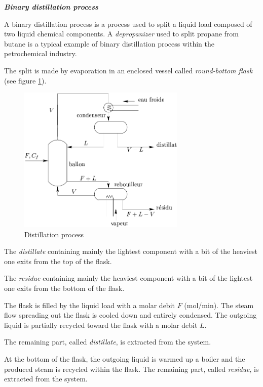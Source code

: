 \begin{exemple}{\bf \em Binary distillation process}

A binary distillation process is a process used to split a liquid load composed of two liquid chemical components.
A {\it depropanizer} used to split propane from butane is a typical example of binary distillation process within the petrochemical industry.

The split is made by evaporation in an enclosed vessel called {\em round-bottom flask} (see figure \ref{Fig:distillation}).
\begin{figure}[h]
\begin{center}
\includegraphics[width=8cm]{images/proc_distil}
\caption{Distillation process}
\label{Fig:distillation}
\end{center} 
\end{figure}
The {\it distillate} containing mainly the lightest component with a bit of the heaviest one exits from the top of the flask.

The {\it residue} containing mainly the heaviest component with a bit of the lightest one exits from the bottom of the flask.

The flask is filled by the liquid load with a molar debit $F$ (mol/min). 
The steam flow spreading out the flask is cooled down and entirely condensed.
The outgoing liquid is partially recycled toward the flask with a molar debit $L$. 

The remaining part, called {\it distillate}, is extracted from the system.

At the bottom of the flask, the outgoing liquid is warmed up a boiler and the produced steam is recycled within the flask.
The remaining part, called {\it residue}, is extracted from the system.


\end{exemple}

